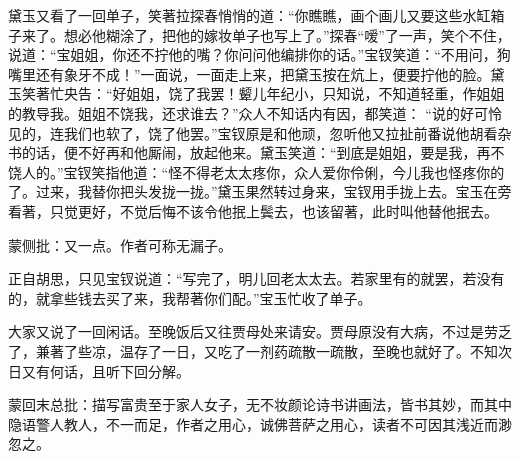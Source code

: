 \begin{parag}


    黛玉又看了一回单子，笑著拉探春悄悄的道：“你瞧瞧，画个画儿又要这些水缸箱子来了。想必他糊涂了，把他的嫁妆单子也写上了。”探春“嗳”了一声，笑个不住，说道：“宝姐姐，你还不拧他的嘴？你问问他编排你的话。”宝钗笑道：“不用问，狗嘴里还有象牙不成！”一面说，一面走上来，把黛玉按在炕上，便要拧他的脸。黛玉笑著忙央告：“好姐姐，饶了我罢！颦儿年纪小，只知说，不知道轻重，作姐姐的教导我。姐姐不饶我，还求谁去？”众人不知话内有因，都笑道： “说的好可怜见的，连我们也软了，饶了他罢。”宝钗原是和他顽，忽听他又拉扯前番说他胡看杂书的话，便不好再和他厮闹，放起他来。黛玉笑道：“到底是姐姐，要是我，再不饶人的。”宝钗笑指他道：“怪不得老太太疼你，众人爱你伶俐，今儿我也怪疼你的了。过来，我替你把头发拢一拢。”黛玉果然转过身来，宝钗用手拢上去。宝玉在旁看著，只觉更好，不觉后悔不该令他抿上鬓去，也该留著，此时叫他替他抿去。\begin{note}蒙侧批：又一点。作者可称无漏子。\end{note}正自胡思，只见宝钗说道：“写完了，明儿回老太太去。若家里有的就罢，若没有的，就拿些钱去买了来，我帮著你们配。”宝玉忙收了单子。
\end{parag}


\begin{parag}


    大家又说了一回闲话。至晚饭后又往贾母处来请安。贾母原没有大病，不过是劳乏了，兼著了些凉，温存了一日，又吃了一剂药疏散一疏散，至晚也就好了。不知次日又有何话，且听下回分解。
\end{parag}

\begin{parag}

    \begin{note}蒙回末总批：描写富贵至于家人女子，无不妆颜论诗书讲画法，皆书其妙，而其中隐语警人教人，不一而足，作者之用心，诚佛菩萨之用心，读者不可因其浅近而渺忽之。\end{note}
\end{parag}


